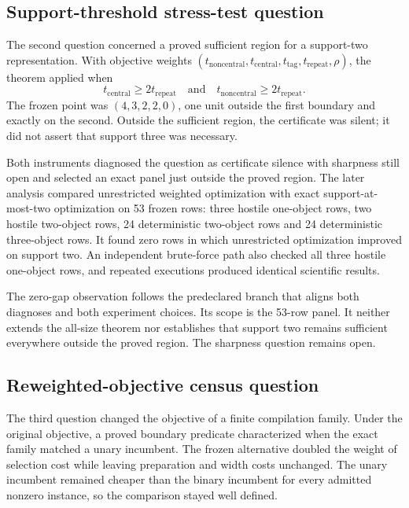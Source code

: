 \documentclass[10pt]{article}
\begin{document}
\subsection{Support-threshold stress-test question}

The second question concerned a proved sufficient region for a support-two representation. With objective weights $(t_{\mathrm{noncentral}},t_{\mathrm{central}},t_{\mathrm{tag}},t_{\mathrm{repeat}},\rho)$, the theorem applied when
\[
t_{\mathrm{central}}\geq 2t_{\mathrm{repeat}}
\quad\text{and}\quad
t_{\mathrm{noncentral}}\geq 2t_{\mathrm{repeat}}.
\]
The frozen point was $(4,3,2,2,0)$, one unit outside the first boundary and exactly on the second. Outside the sufficient region, the certificate was silent; it did not assert that support three was necessary.

Both instruments diagnosed the question as certificate silence with sharpness still open and selected an exact panel just outside the proved region. The later analysis compared unrestricted weighted optimization with exact support-at-most-two optimization on 53 frozen rows: three hostile one-object rows, two hostile two-object rows, 24 deterministic two-object rows and 24 deterministic three-object rows. It found zero rows in which unrestricted optimization improved on support two. An independent brute-force path also checked all three hostile one-object rows, and repeated executions produced identical scientific results.

The zero-gap observation follows the predeclared branch that aligns both diagnoses and both experiment choices. Its scope is the 53-row panel. It neither extends the all-size theorem nor establishes that support two remains sufficient everywhere outside the proved region. The sharpness question remains open.

\subsection{Reweighted-objective census question}

The third question changed the objective of a finite compilation family. Under the original objective, a proved boundary predicate characterized when the exact family matched a unary incumbent. The frozen alternative doubled the weight of selection cost while leaving preparation and width costs unchanged. The unary incumbent remained cheaper than the binary incumbent for every admitted nonzero instance, so the comparison stayed well defined.
\end{document}
